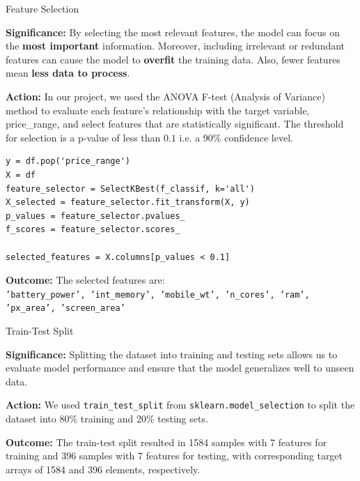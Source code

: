 \documentclass[14pt, aspectratio=169]{beamer}
\begin{document}
\begin{frame}{Feature Selection}
  \begin{block}{}
    \textbf{Significance:} \small
    By selecting the most relevant features, the model can focus on the \textbf{most important} information. Moreover, including irrelevant or redundant features can cause the model to \textbf{overfit} the training data. Also, fewer features mean \textbf{less data to process}.
  \end{block}
  \begin{block}{}
    \textbf{Action:} \small
    In our project, we used the ANOVA F-test (Analysis of Variance) method to evaluate each feature's relationship with the target variable, price\_range, and select features that are statistically significant. The threshold for selection is a p-value of less than $0.1$ i.e. a $90\%$ confidence level.
  \end{block}
\footnotesize
  \begin{verbatim}
y = df.pop('price_range')
X = df
feature_selector = SelectKBest(f_classif, k='all')  
X_selected = feature_selector.fit_transform(X, y)
p_values = feature_selector.pvalues_
f_scores = feature_selector.scores_

selected_features = X.columns[p_values < 0.1]
  \end{verbatim}
  \normalsize
  \begin{block}{}
    \textbf{Outcome:} \small
    The selected features are: \\
    \texttt{'battery\_power', 'int\_memory', 'mobile\_wt', 'n\_cores', 'ram', 'px\_area', 'screen\_area'}
  \end{block}
\end{frame}

\begin{frame}{Train-Test Split}
  \begin{block}{}
    \textbf{Significance:} \small
    Splitting the dataset into training and testing sets allows us to evaluate model performance and ensure that the model generalizes well to unseen data.
  \end{block}
  \begin{block}{}
    \textbf{Action:} \small
    We used \texttt{train\_test\_split} from \texttt{sklearn.model\_selection} to split the dataset into 80\% training and 20\% testing sets.
  \end{block}
  \begin{block}{}
    \textbf{Outcome:} \small
    The train-test split resulted in 1584 samples with 7 features for training and 396 samples with 7 features for testing, with corresponding target arrays of 1584 and 396 elements, respectively.
  \end{block}
\end{frame}
\end{document}
